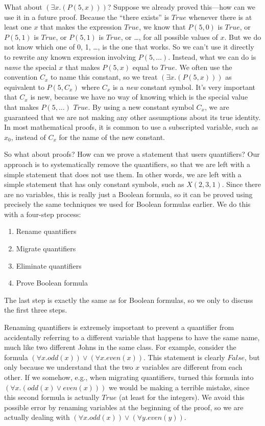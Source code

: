 What about $(\exists x.(P(5, x)))$? Suppose we already proved this---how can we use it in a future proof. Because
the ``there exists'' is $True$ whenever there is at least one $x$ that makes the expression $True$, we know that
$P(5, 0)$ is $True$, or $P(5, 1)$ is $True$, or $P(5, 1)$ is $True$, or \dots, for all possible values of $x$. But
we do not know which one of 0, 1, \dots, is the one that works. So we can't use it directly to rewrite any known
expression involving $P(5, \dots)$. Instead, what we can do is \emph{name} the special $x$ that makes $P(5, x)$
equal to $True$. We often use the convention $C_x$ to name this constant, so we treat $(\exists x.(P(5, x)))$ as
equivalent to $P(5, C_x)$ where $C_x$ is a \emph{new} constant symbol. It's very important that $C_x$ is new, because
we have no way of knowing which is the special value that makes $P(5, \dots)$ $True$. By using a new constant
symbol $C_x$, we are guaranteed that we are not making any other assumptions about its true identity. In most
mathematical proofs, it is common to use a subscripted variable, such as $x_0$, instead of $C_x$ for the name
of the new constant.

So what about proofs? How can we prove a statement that users quantifiers? Our approach is to systematically
remove the quantifiers, so that we are left with a simple statement that does not use them. In other words, we
are left with a simple statement that has only constant symbols, such as $X(2, 3, 1)$. Since there are no variables,
this is really just a Boolean formula, so it can be proved using precisely the same techniques we used for Boolean 
formulas earlier. We do this with a four-step process:
\begin{enumerate}
    \item Rename quantifiers
    \item Migrate quantifiers
    \item Eliminate quantifiers
    \item Prove Boolean formula
\end{enumerate}
The last step is exactly the same as for Boolean formulas, so we only to discuss the first three steps.

Renaming quantifiers is extremely important to prevent a quantifier from accidentally referring to a different variable
that happens to have the same name, much like two different Johns in the same class. For example, consider the formula 
$(\forall x.odd(x)) \vee (\forall x.even(x))$. This
statement is clearly $False$, but only because we understand that the two $x$ variables are different from each other. If
we somehow, e.g., when migrating quantifiers, turned this formula into $(\forall x.(odd(x) \vee even(x)))$ we would be
making a terrible mistake, since this second formula is actually $True$ (at least for the integers). We avoid this possible
error by renaming variables at the beginning of the proof, so we are actually dealing with $(\forall x.odd(x)) \vee (\forall y.even(y))$.

